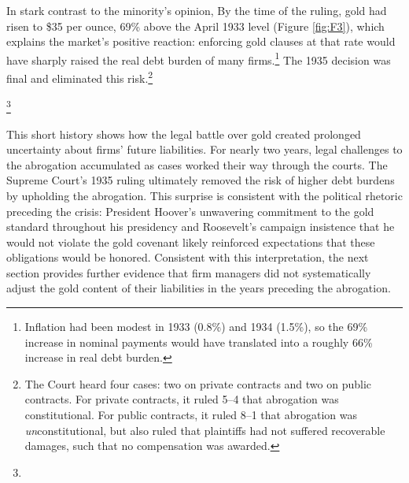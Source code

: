 In stark contrast to the minority's opinion,  By the time of the ruling, gold had risen to \$35 per ounce, 69\% above the April 1933 level (Figure \ref{fig:F3}), which explains the market's positive reaction: enforcing gold clauses at that rate would have sharply raised the real debt burden of many firms.\footnote{Inflation had been modest in 1933 (0.8\%) and 1934 (1.5\%), so the 69\% increase in nominal payments would have translated into a roughly 66\% increase in real debt burden.} The 1935 decision was final and eliminated this risk.\footnote{The Court heard four cases: two on private contracts and two on public contracts. For private contracts, it ruled 5–4 that abrogation was constitutional. For public contracts, it ruled 8–1 that abrogation was \textit{un}constitutional, but also ruled that plaintiffs had not suffered recoverable damages, such that no compensation was awarded.}

\footnote{}

This short history shows how the legal battle over gold created prolonged uncertainty about firms' future liabilities. For nearly two years, legal challenges to the abrogation accumulated as cases worked their way through the courts. The Supreme Court's 1935 ruling ultimately removed the risk of higher debt burdens by upholding the abrogation.  This surprise is consistent with the political rhetoric preceding the crisis: President Hoover's unwavering commitment to the gold standard throughout his presidency and Roosevelt's campaign insistence that he would not violate the gold covenant likely reinforced expectations that these obligations would be honored. Consistent with this interpretation, the next section provides further evidence that firm managers did not systematically adjust the gold content of their liabilities in the years preceding the abrogation.
